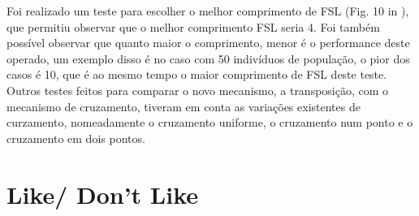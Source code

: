 \documentclass[12pt,portuguese,a4paper]{article}
\begin{document}
Foi realizado um teste para escolher o melhor comprimento de FSL (Fig. 10 in \cite{Simoes99transposition:a}), que permitiu observar que o melhor comprimento FSL seria 4. Foi também possível observar que quanto maior o comprimento, menor é o performance deste operado, um exemplo disso é no caso com 50 indivíduos de população, o pior dos casos é 10, que é ao mesmo tempo o maior comprimento de FSL deste teste.
Outros testes feitos para comparar o novo mecanismo, a transposição, com o mecanismo de cruzamento, tiveram em conta as variações existentes de curzamento, nomeadamente o cruzamento uniforme, o cruzamento num ponto e o cruzamento em dois pontos.
\section{Like/ Don't Like}




\end{document}
